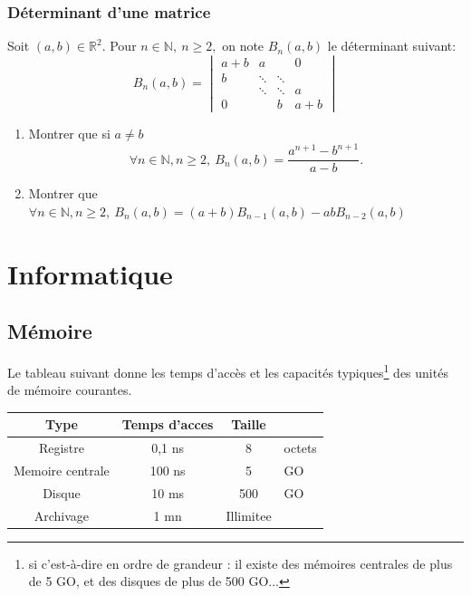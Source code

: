 \documentclass[a4paper, 12pt]{article}
\begin{document}
            \subsubsection{D\'eterminant d'une matrice}

            Soit $(a,b) \in \mathbb{R}^2$. Pour $n \in \mathbb{N},~ n \geq 2,$ on note $B_n(a,b)$ le d\'eterminant suivant:
            $$
            B_n(a,b)= \begin{vmatrix}
                 a+b& a& & 0\\
                 b &\ddots& \ddots &\\
                 & \ddots& \ddots& a\\
                 0 & & b & a+b
            \end{vmatrix}
            $$
            \begin{enumerate}
                \item Montrer que si $a \neq b$ 
                $$\forall{n} \in \mathbb{N},n \geq 2,~ B_n(a,b)=\frac{a^{n+1}-b^{n+1}}{a-b}.$$
                \item Montrer que $\forall{n} \in \mathbb{N},n \geq 2,~ B_n(a,b)=(a+b)B_{n-1}(a,b)-abB_{n-2}(a,b)$
                
            \end{enumerate}
            \section{Informatique}
            \subsection{M\'emoire}

            Le tableau suivant donne les temps d'acc\`es et les capacit\'es typiques\footnote{si c'est-\`a-dire en ordre de grandeur : il existe des m\'emoires centrales de plus de 5 GO, et des disques de plus de 500 GO...} des unit\'es de m\'emoire courantes.
            \begin{table}[hb]
                
                \centering
                    \begin{tabular}{||c | c | cl ||}
                        \hline
                        \textbf{Type} & \textbf{Temps d'acces} & \textbf{Taille} &\\ \hline \hline
                        Registre & 0,1 ns & 8 & octets\\ \hline
                        Memoire centrale & 100 ns &  5 &GO\\ \hline
                        Disque & 10 ms & 500 &GO\\ \hline
                        Archivage & 1 mn & Illimitee & \\
                        \hline
                    \end{tabular}
               
                
            \end{table}
            
\end{document}
